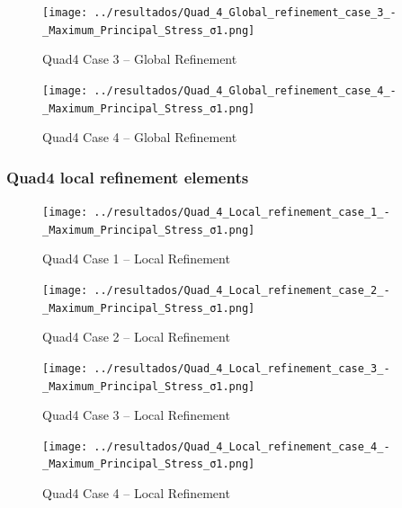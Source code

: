\documentclass[12pt]{article}
\begin{document}
\begin{figure}[H]
    \centering
    \begin{minipage}{0.48\textwidth}
        \centering
        \texttt{[image: ../resultados/Quad\_4\_Global\_refinement\_case\_3\_-\_Maximum\_Principal\_Stress\_σ1.png]}
        \caption{Quad4 Case 3 – Global Refinement}
        \label{fig:quad4_results_global3}
    \end{minipage}
    \hfill
    \begin{minipage}{0.48\textwidth}
        \centering
        \texttt{[image: ../resultados/Quad\_4\_Global\_refinement\_case\_4\_-\_Maximum\_Principal\_Stress\_σ1.png]}
        \caption{Quad4 Case 4 – Global Refinement}
        \label{fig:quad4_results_global4}
    \end{minipage}
\end{figure}

\newpage
\subsubsection{Quad4 local refinement elements}
\begin{figure}[H]
    \centering
    \begin{minipage}{0.48\textwidth}
        \centering
        \texttt{[image: ../resultados/Quad\_4\_Local\_refinement\_case\_1\_-\_Maximum\_Principal\_Stress\_σ1.png]}
        \caption{Quad4 Case 1 – Local Refinement}
        \label{fig:quad4_results_local1}
    \end{minipage}
    \hfill
    \begin{minipage}{0.48\textwidth}
        \centering
        \texttt{[image: ../resultados/Quad\_4\_Local\_refinement\_case\_2\_-\_Maximum\_Principal\_Stress\_σ1.png]}
        \caption{Quad4 Case 2 – Local Refinement}
        \label{fig:quad4_results_local2}
    \end{minipage}
\end{figure}

\begin{figure}[H]
    \centering
    \begin{minipage}{0.48\textwidth}
        \centering
        \texttt{[image: ../resultados/Quad\_4\_Local\_refinement\_case\_3\_-\_Maximum\_Principal\_Stress\_σ1.png]}
        \caption{Quad4 Case 3 – Local Refinement}
        \label{fig:quad4_results_local3}
    \end{minipage}
    \hfill
    \begin{minipage}{0.48\textwidth}
        \centering
        \texttt{[image: ../resultados/Quad\_4\_Local\_refinement\_case\_4\_-\_Maximum\_Principal\_Stress\_σ1.png]}
        \caption{Quad4 Case 4 – Local Refinement}
        \label{fig:quad4_results_local4}
    \end{minipage}
\end{figure}
\end{document}
